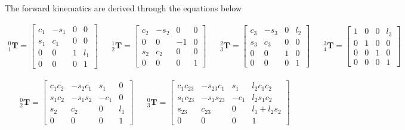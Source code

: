 The forward kinematics are derived through the equations below

\begin{align}
    ^{0}_{1}\mathbf{T} = \begin{bmatrix}
        c_1 & -s_1 & 0 & 0 \\
        s_1 & c_1 & 0 & 0 \\
        0 & 0 & 1 & l_1 \\
        0 & 0 & 0 & 1
        \end{bmatrix}
    &&
    ^{1}_{2}\mathbf{T} = \begin{bmatrix}
        c_2 & -s_2 & 0 & 0 \\
        0 & 0 & -1 & 0 \\
        s_2 & c_2 & 0 & 0 \\
        0 & 0 & 0 & 1
        \end{bmatrix}
    &&
    ^{2}_{3}\mathbf{T} = \begin{bmatrix}
        c_3 & -s_3 & 0 & l_2 \\
        s_3 & c_3 & 0 & 0 \\
        0 & 0 & 1 & 0 \\
        0 & 0 & 0 & 1
        \end{bmatrix}
    &&
    ^{3}_{4}\mathbf{T} = \begin{bmatrix}
        1 & 0 & 0 & l_3 \\
        0 & 1 & 0 & 0 \\
        0 & 0 & 1 & 0 \\
        0 & 0 & 0 & 1
        \end{bmatrix}
    \nonumber
\end{align}

\begin{align}
    ^{0}_{2}\mathbf{T} = \begin{bmatrix}
        c_1 c_2 & -s_2 c_1 & s_1 & 0 \\
        s_1 c_2 & -s_1 s_2 & -c_1 & 0 \\
        s_2 & c_2 & 0 & l_1 \\
        0 & 0 & 0 & 1
        \end{bmatrix} &&
    ^{0}_{3}\mathbf{T} = \begin{bmatrix}
        c_1 c_{23} & -s_{23} c_1 & s_1 & l_2 c_1 c_2 \\
        s_1 c_{23} & -s_1 s_{23} & -c_1 & l_2 s_1 c_2 \\
        s_{23} & c_{23} & 0 & l_1 +l_2 s_2 \\
        0 & 0 & 0 & 1
        \end{bmatrix}
    \label{eq:3r-op-tfs-0}
\end{align}

